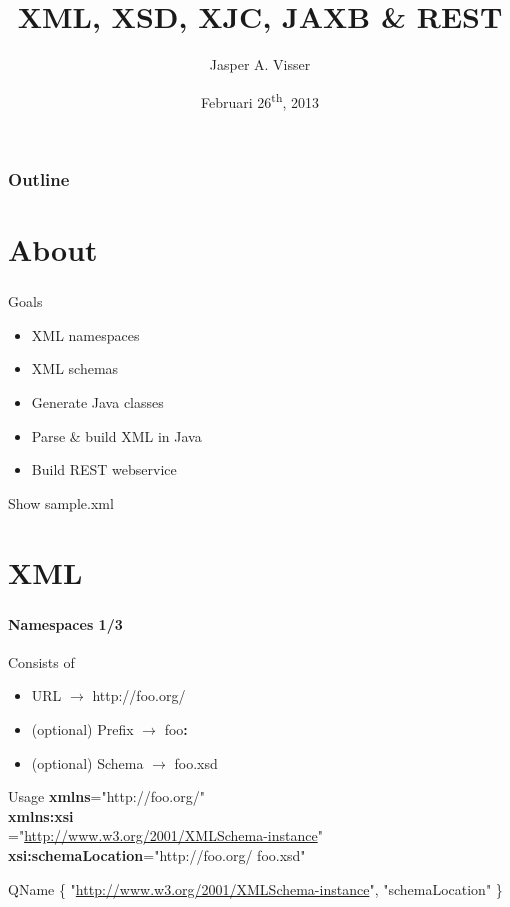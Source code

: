 \documentclass[handout]{beamer}
\title[XML]{XML, XSD, XJC, JAXB \& REST}
\author[Jasper A. Visser]{Jasper A. Visser}
\institute[Portavita]{Portavita BV}
\date{Februari 26\textsuperscript{th}, 2013}
\begin{document}
\begin{frame}
	\inserttitlegraphic
	\vspace{5mm}
	\titlepage
\end{frame}

\begin{frame}
	\frametitle{Outline}
	\tableofcontents
\end{frame}

\section*{About}
\begin{frame}
	\frametitle{\insertsection}
	\begin{block}{Goals}
		\begin{itemize}
			\item XML namespaces
			\item XML schemas
			\item Generate Java classes
			\item Parse \& build XML in Java
			\item Build REST webservice
		\end{itemize}
	\end{block}
	\begin{semiverbatim}
		Show sample.xml
	\end{semiverbatim}
\end{frame}

\section{XML}
\begin{frame}
	\frametitle{\insertsection}
	\framesubtitle{Namespaces 1/3}
	\begin{block}{Consists of}
		\begin{itemize}
			\item URL $\rightarrow$ http://foo.org/
			\item (optional) Prefix $\rightarrow$ foo\textbf{:}
			\item (optional) Schema $\rightarrow$ foo.xsd
		\end{itemize}
	\end{block}
	\begin{block}{Usage} \small
		\textbf{xmlns}="http://foo.org/" \\
		\textbf{xmlns:xsi}\\="\url{http://www.w3.org/2001/XMLSchema-instance}" \\
		\textbf{xsi:schemaLocation}="http://foo.org/ foo.xsd" \\
	\end{block}
	\begin{block}{QName} \small
		\{ "\url{http://www.w3.org/2001/XMLSchema-instance}", "schemaLocation" \} \\
	\end{block}
\end{frame}
\end{document}
